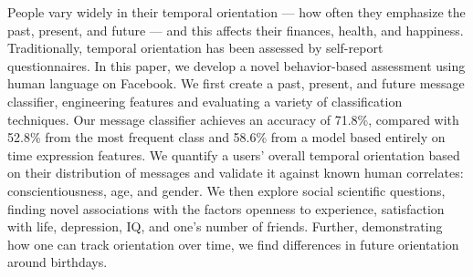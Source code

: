 People vary widely in their temporal orientation --- how often they emphasize the past, present, and future --- and this affects their finances, health, and happiness. Traditionally, temporal orientation has been assessed by self-report questionnaires. In this paper, we develop a novel behavior-based assessment using human language on Facebook. We first create a past, present, and future message classifier, engineering features and evaluating a variety of classification techniques. Our message classifier achieves an accuracy of 71.8\%, compared with 52.8\% from the most frequent class and 58.6\% from a model based entirely on time expression features. We quantify a users' overall temporal orientation based on their distribution of messages and validate it against known human correlates: conscientiousness, age, and gender. We then explore social scientific questions, finding novel associations with the factors openness to experience, satisfaction with life, depression, IQ, and one's number of friends. Further, demonstrating how one can track orientation over time, we find differences in future orientation around birthdays.

